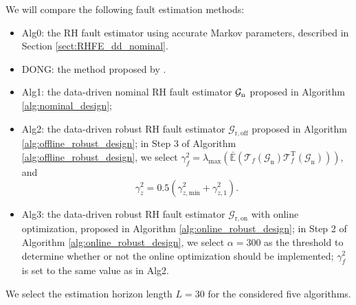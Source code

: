 \documentclass[twocolumn]{autart}
\begin{document}
We will compare the following fault estimation methods:
\begin{itemize}
  \item Alg0: the RH fault estimator using accurate Markov parameters, described in Section \ref{sect:RHFE_dd_nominal}.
  \item DONG: the method proposed by \cite{Dong2012c}.
  \item Alg1: the data-driven nominal RH fault estimator $\mathcal{G}_{\rm{n}}$ proposed in Algorithm \ref{alg:nominal_design};
  \item Alg2: the data-driven robust RH fault estimator $\mathcal{G}_{\mathrm{r,off}}$ proposed in Algorithm \ref{alg:offline_robust_design}; in Step 3 of Algorithm \ref{alg:offline_robust_design}, we select $\gamma_f^2 = \lambda_{\text{max}} \left( \mathbb{\bar E} \left( {\mathcal{T}}_{f} \left( \mathcal{G}_{\text{n}} \right) {\mathcal{T}}_{f}^\text{T} \left( \mathcal{G}_{\text{n}} \right) \right) \right)$, and
      \begin{equation}\label{eq:alg2_gammaz}
      \gamma_z^2 = 0.5 \left( \gamma_{z,\text{min}}^2 + \gamma_{z,1}^2 \right).
      \end{equation}
  \item Alg3: the data-driven robust RH fault estimator $\mathcal{G}_{\mathrm{r,on}}$ with online optimization, proposed in Algorithm \ref{alg:online_robust_design}; in Step 2 of Algorithm \ref{alg:online_robust_design}, we select $\alpha=300$ as the threshold to determine whether or not the online optimization should be implemented; $\gamma_f^2$ is set to the same value as in Alg2.
\end{itemize}

We select the estimation horizon length $L=30$ for the considered five algorithms.
\end{document}
